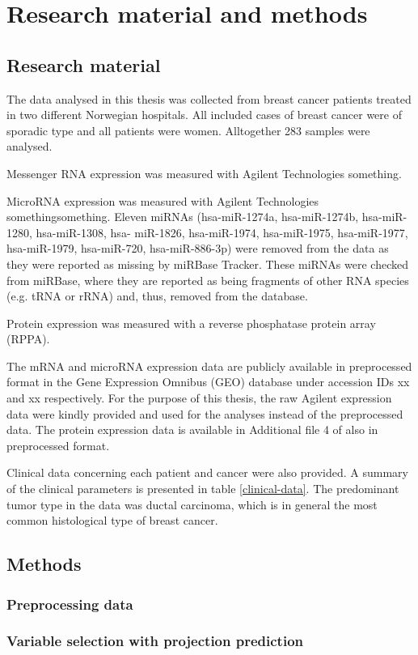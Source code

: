 


\section{Research material and methods}\label{material-and-methods}

\subsection{Research material}

The data analysed in this thesis was collected from breast cancer patients treated
in two different Norwegian hospitals. All included cases of breast cancer were
of sporadic type and all patients were women. Alltogether 283 samples were analysed.

Messenger RNA expression was measured with Agilent Technologies something.

MicroRNA expression was measured with Agilent Technologies somethingsomething.
Eleven miRNAs (hsa-miR-1274a, hsa-miR-1274b, hsa-miR-1280, hsa-miR-1308, hsa-
miR-1826, hsa-miR-1974, hsa-miR-1975, hsa-miR-1977, hsa-miR-1979, hsa-miR-720,
hsa-miR-886-3p) were removed from the data as they were reported as missing by
miRBase Tracker. These miRNAs were checked from miRBase, where they are
reported as being fragments of other RNA species (e.g. tRNA or rRNA) and,
thus, removed from the database.

Protein expression was measured with a reverse phosphatase protein array (RPPA).

The mRNA and microRNA expression data are publicly available in preprocessed
format in the Gene Expression Omnibus (GEO) database \citep{GEO} under
accession IDs xx and xx respectively. For the
purpose of this thesis, the raw Agilent expression data were kindly provided
and used for the analyses instead of the preprocessed data. The protein expression data is available
in Additional file 4 of \citet{norjis} also in preprocessed format. 



Clinical data concerning each patient and cancer were also provided. A summary
of the clinical parameters is presented in table \ref{clinical-data}. The
predominant tumor type in the data was ductal carcinoma, which is in general
the most common histological type of breast cancer.



\subsection{Methods}

\subsubsection{Preprocessing data}

\subsubsection{Variable selection with projection prediction}

